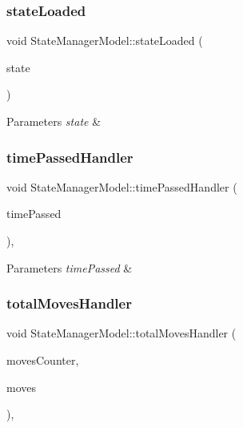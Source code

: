 \subsubsection{\texorpdfstring{stateLoaded}{stateLoaded}}
{\footnotesize\ttfamily void State\+Manager\+Model\+::state\+Loaded (\begin{DoxyParamCaption}\item[{const \mbox{\hyperlink{struct_load_state}{Load\+State}} \&}]{state }\end{DoxyParamCaption})\hspace{0.3cm}{\ttfamily [signal]}}


\begin{DoxyParams}{Parameters}
{\em state} & \\
\hline
\end{DoxyParams}
\mbox{\label{class_state_manager_model_ab3f4c9b1d44a75c63c034e79f88ee9f0}} 
\subsubsection{\texorpdfstring{timePassedHandler}{timePassedHandler}}
{\footnotesize\ttfamily void State\+Manager\+Model\+::time\+Passed\+Handler (\begin{DoxyParamCaption}\item[{const size\+\_\+t \&}]{time\+Passed }\end{DoxyParamCaption})\hspace{0.3cm}{\ttfamily [inline]}, {\ttfamily [slot]}}


\begin{DoxyParams}{Parameters}
{\em time\+Passed} & \\
\hline
\end{DoxyParams}
\mbox{\label{class_state_manager_model_a3cd67127d4b7edcb431db1d700f0048e}} 
\subsubsection{\texorpdfstring{totalMovesHandler}{totalMovesHandler}}
{\footnotesize\ttfamily void State\+Manager\+Model\+::total\+Moves\+Handler (\begin{DoxyParamCaption}\item[{const size\+\_\+t \&}]{moves\+Counter,  }\item[{const std\+::list$<$ std\+::shared\+\_\+ptr$<$ \mbox{\hyperlink{struct_move}{Move}} $>$$>$ \&}]{moves }\end{DoxyParamCaption})\hspace{0.3cm}{\ttfamily [inline]}, {\ttfamily [slot]}}



